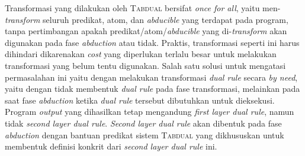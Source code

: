 Transformasi yang dilakukan oleh \textsc{Tabdual} bersifat \textit{once for all}, yaitu men-\textit{transform} seluruh predikat, atom, dan \textit{abducible} yang terdapat pada program, tanpa pertimbangan apakah predikat/atom/\textit{abducible} yang di-\textit{transform} akan digunakan pada fase \textit{abduction} atau tidak. Praktis, transformasi seperti ini harus dihindari dikarenakan \textit{cost} yang diperlukan terlalu besar untuk melakukan transformasi yang belum tentu digunakan. Salah satu solusi untuk mengatasi permasalahan ini yaitu dengan melakukan transformasi \textit{dual rule} secara \textit{by need}, yaitu dengan tidak membentuk \textit{dual rule} pada fase transformasi, melainkan pada saat fase \textit{abduction} ketika \textit{dual rule} tersebut dibutuhkan untuk dieksekusi. Program \textit{output} yang dihasilkan tetap mengandung \textit{first layer dual rule}, namun tidak \textit{second layer dual rule}. \textit{Second layer dual rule} akan dibentuk pada fase \textit{abduction} dengan bantuan predikat sistem \textsc{Tabdual} yang dikhususkan untuk membentuk definisi konkrit dari \textit{second layer dual rule} ini.

